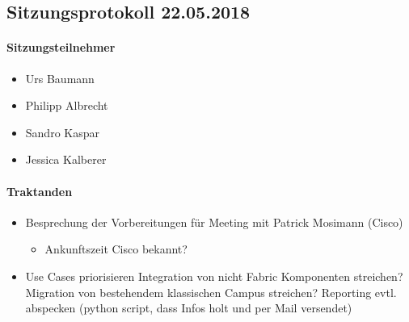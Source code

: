 \subsection{Sitzungsprotokoll 22.05.2018}

\paragraph{Sitzungsteilnehmer}
\begin{itemize}	
	\item Urs Baumann
	\item Philipp Albrecht
	\item Sandro Kaspar
	\item Jessica Kalberer
\end{itemize}

\paragraph{Traktanden}
\begin{itemize}	
	\item Besprechung der Vorbereitungen für Meeting mit Patrick Mosimann (Cisco)
	\begin{itemize}
		\item Ankunftszeit Cisco bekannt?
	\end{itemize}
	\item Use Cases priorisieren
		\subitem Integration von nicht Fabric Komponenten streichen?
		\subitem Migration von bestehendem klassischen Campus streichen?
		\subitem Reporting evtl. abspecken (python script, dass Infos holt und per Mail versendet)
\end{itemize}

